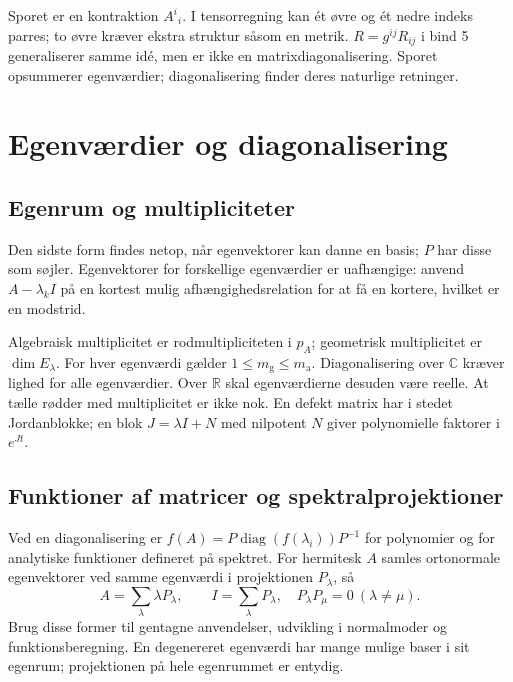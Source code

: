 Sporet er en kontraktion $A^i{}_i$. I tensorregning kan ét øvre og ét
nedre indeks parres; to øvre kræver ekstra struktur såsom en metrik.
$R=g^{ij}R_{ij}$ i bind 5 generaliserer samme idé, men er ikke en
matrixdiagonalisering. Sporet opsummerer egenværdier; diagonalisering
finder deres naturlige retninger.

\section{Egenværdier og diagonalisering}
\subsection{Egenrum og multipliciteter}
Den sidste form findes netop, når egenvektorer kan danne en basis;
$P$ har disse som søjler. Egenvektorer for forskellige egenværdier er
uafhængige: anvend $A-\lambda_k I$ på en kortest mulig afhængighedsrelation
for at få en kortere, hvilket er en modstrid.



Algebraisk multiplicitet er rodmultipliciteten i $p_A$; geometrisk
multiplicitet er $\dim E_\lambda$. For hver egenværdi gælder
$1\le m_{\mathrm g}\le m_{\mathrm a}$. Diagonalisering over $\mathbb C$
kræver lighed for alle egenværdier. Over $\mathbb R$ skal egenværdierne
desuden være reelle. At tælle rødder med multiplicitet er ikke nok.
En defekt matrix har i stedet Jordanblokke; en blok
$J=\lambda I+N$ med nilpotent $N$ giver polynomielle faktorer i $e^{Jt}$.

\subsection{Funktioner af matricer og spektralprojektioner}
Ved en diagonalisering er
$f(A)=P\operatorname{diag}(f(\lambda_i))P^{-1}$ for polynomier og for
analytiske funktioner defineret på spektret.
For hermitesk $A$ samles ortonormale egenvektorer ved samme egenværdi i
projektionen $P_\lambda$, så
\[
A=\sum_\lambda\lambda P_\lambda,\qquad
I=\sum_\lambda P_\lambda,\quad P_\lambda P_\mu=0\ (\lambda\ne\mu).
\]
Brug disse former til gentagne anvendelser, udvikling i normalmoder og
funktionsberegning. En degenereret egenværdi har mange mulige baser i
sit egenrum; projektionen på hele egenrummet er entydig.

